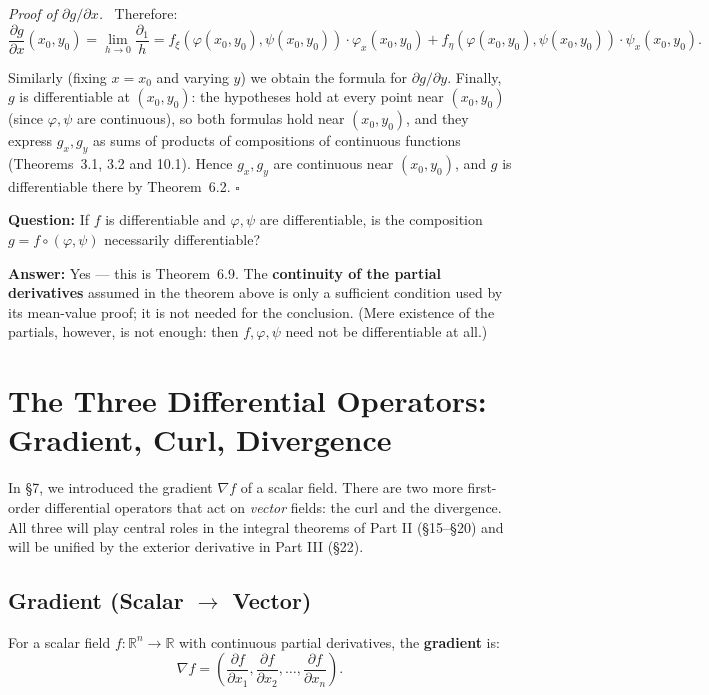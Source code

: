 \documentclass[11pt]{report}
\renewenvironment{proof}[1][Proof]{\par\noindent\textit{#1.}\ }{\hfill$\square$\par\medskip}
\newcommand{\R}{\mathbb{R}}
\newcommand{\parti}[2]{\frac{\partial #1}{\partial #2}}
\begin{document}
\begin{proof}[Proof of $\partial g / \partial x$]
Therefore:
\[
\frac{\partial g}{\partial x}(x_0, y_0) = \lim_{h \to 0} \frac{\partial_1}{h} = f_\xi(\varphi(x_0,y_0), \psi(x_0,y_0)) \cdot \varphi_x(x_0, y_0) + f_\eta(\varphi(x_0,y_0), \psi(x_0,y_0)) \cdot \psi_x(x_0, y_0).
\]

Similarly (fixing $x = x_0$ and varying $y$) we obtain the formula for $\partial g / \partial y$. Finally, $g$ is differentiable at $(x_0, y_0)$: the hypotheses hold at every point near $(x_0, y_0)$ (since $\varphi, \psi$ are continuous), so both formulas hold near $(x_0, y_0)$, and they express $g_x, g_y$ as sums of products of compositions of continuous functions (Theorems~3.1, 3.2 and 10.1). Hence $g_x, g_y$ are continuous near $(x_0, y_0)$, and $g$ is differentiable there by Theorem~6.2.
\end{proof}

\begin{remark}
\textbf{Question:} If $f$ is differentiable and $\varphi, \psi$ are differentiable, is the composition $g = f \circ (\varphi, \psi)$ necessarily differentiable?

\textbf{Answer:} Yes --- this is Theorem~6.9. The \textbf{continuity of the partial derivatives} assumed in the theorem above is only a sufficient condition used by its mean-value proof; it is not needed for the conclusion. (Mere existence of the partials, however, is not enough: then $f, \varphi, \psi$ need not be differentiable at all.)
\end{remark}

\section{The Three Differential Operators: Gradient, Curl, Divergence}

In \S7, we introduced the gradient $\nabla f$ of a scalar field. There are two more first-order differential operators that act on \textit{vector} fields: the curl and the divergence. All three will play central roles in the integral theorems of Part II (\S15--\S20) and will be unified by the exterior derivative in Part III (\S22).

\subsection*{Gradient (Scalar $\to$ Vector)}

For a scalar field $f: \R^n \to \R$ with continuous partial derivatives, the \textbf{gradient} is:
\[
\nabla f = \left(\parti{f}{x_1}, \parti{f}{x_2}, \ldots, \parti{f}{x_n}\right).
\]
\end{document}
